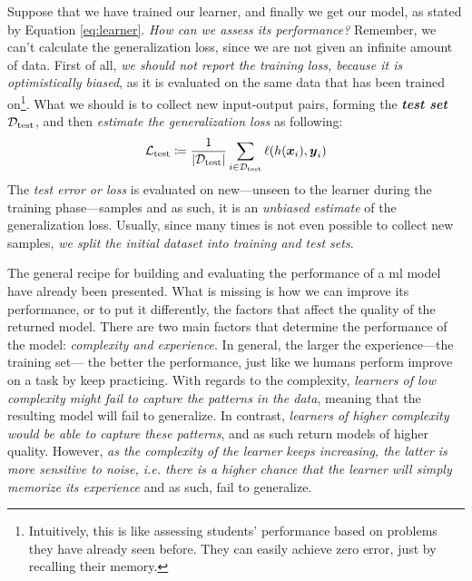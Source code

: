 Suppose that we have trained our learner, and finally we get our model, as
stated by Equation \ref{eq:learner}. \emph{How can we assess its
performance?} Remember, we can't calculate the generalization
loss, since we are not given an infinite amount of
data. First of all, \emph{we should not report the training loss, because it is optimistically biased}, as it
is evaluated on the same data that has been trained on\footnote{Intuitively,
this is like assessing students' performance based on problems they have already
seen before. They can easily achieve zero error, just by recalling their
memory.}. What we should is to collect new input-output pairs, forming the
\emph{\textbf{test set}} $\mathcal{D}_\text{test}$, and then \emph{estimate the
generalization loss} as following:
\begin{equation}
	\label{eq:test_loss}
	\mathcal{L}_\text{test} \coloneqq \frac{1}{\lvert \mathcal{D}_\text{test} \rvert} \sum_{i \in \mathcal{D}_\text{test}}
	\ell(h(\boldsymbol{x}_i), \boldsymbol{y}_i)
\end{equation}
The \emph{test error or loss} is evaluated on
new---unseen to the learner during the training phase---samples and as such, it is an \emph{unbiased estimate} of the generalization loss. Usually, since many times is not even
possible to collect new samples, \emph{we split the initial
dataset into training and test sets}.

The general recipe for building and evaluating the performance of a \gls{ml}
model have already been presented. What is missing is how we can improve its
performance, or to put it differently, the factors that affect the quality of
the returned model. There are two main factors that determine the performance of
the model: \emph{complexity and experience}.
In general, the larger the experience---the training set---
the better the performance, just like we humans perform improve on a task by
keep practicing. With regards to the complexity, \emph{learners of low
complexity might fail to capture the patterns in the
data}, meaning that the resulting model will fail to generalize. In contrast,
\emph{learners of higher complexity would be able to capture these patterns},
and as such return models of higher quality. However, \emph{as the complexity of
the learner keeps increasing, the latter is more sensitive to noise, i.e. there
is a higher chance that the learner will simply memorize its experience} and as
such, fail to generalize.

